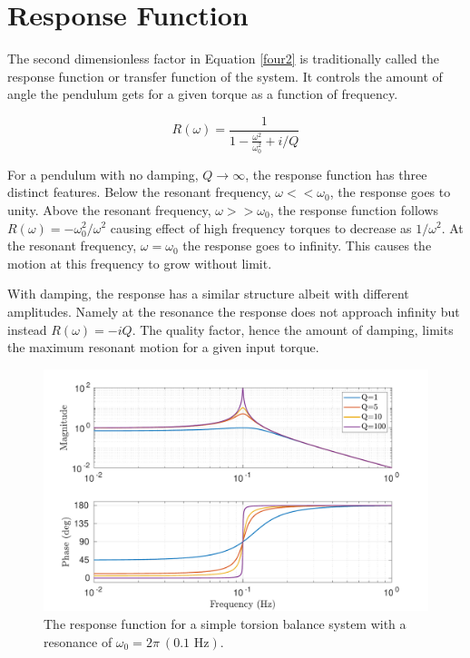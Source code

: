 \documentclass{book}
\begin{document}
\section{Response Function}\label{resp}

\quad The second dimensionless factor in Equation \ref{four2} is traditionally called the response function or transfer function of the system. It controls the amount of angle the pendulum gets for a given torque as a function of frequency. 

\begin{equation}
R(\omega)= \frac{1}{1-\frac{\omega^2}{\omega_0^2} +i/Q} \label{four3}
\end{equation}

For a pendulum with no damping, $Q\rightarrow\infty$, the response function has three distinct features. Below the resonant frequency, $\omega << \omega_0$, the response goes to unity. Above the resonant frequency, $\omega >> \omega_0$, the response function follows $R(\omega)=-\omega_0^2/\omega^2$ causing effect of high frequency torques to decrease as $1/\omega^2$. At the resonant frequency, $\omega=\omega_0$ the response goes to infinity. This causes the motion at this frequency to grow without limit.

With damping, the response has a similar structure albeit with different amplitudes. Namely at the resonance the response does not approach infinity but instead $R(\omega)=-i Q$. The quality factor, hence the amount of damping, limits the maximum resonant motion for a given input torque. 

\begin{figure}[!h]
\begin{centering}
\includegraphics[width=\textwidth]{ResponseFunction.pdf}
\caption{The response function for a simple torsion balance system with a resonance of $\omega_0=2\pi\ (0.1 \text{ Hz})$.}\label{respPlot}
\end{centering}
\end{figure}
\end{document}
